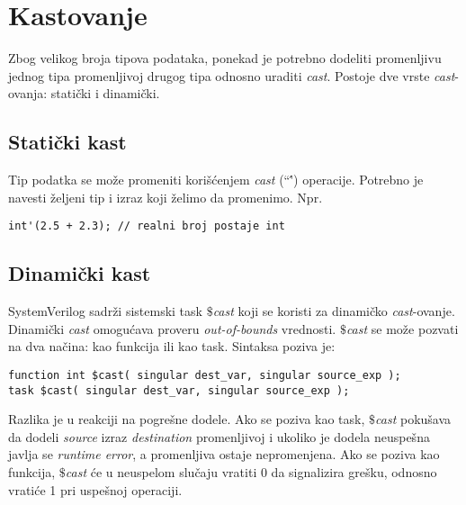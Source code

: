 \section{Kastovanje}

Zbog velikog broja tipova podataka, ponekad je potrebno dodeliti promenljivu
jednog tipa promenljivoj drugog tipa odnosno uraditi \emph{cast}. Postoje dve
vrste \emph{cast}-ovanja: statički i dinamički.


\subsection{Statički kast}

Tip podatka se može promeniti korišćenjem \emph{cast} (``\textquotesingle\'') operacije.
Potrebno je navesti željeni tip i izraz koji želimo da promenimo. Npr.

\begin{lstlisting}
int'(2.5 + 2.3); // realni broj postaje int
\end{lstlisting}


\subsection{Dinamički kast}

SystemVerilog sadrži sistemski task \emph{\(\$\)cast} koji se koristi za
dinamičko \emph{cast}-ovanje.
Dinamički \emph{cast} omogućava proveru \emph{out-of-bounds} vrednosti.
\emph{\(\$\)cast} se može pozvati na dva načina: kao funkcija ili kao task.
Sintaksa poziva je:

\begin{lstlisting}
function int $cast( singular dest_var, singular source_exp );
task $cast( singular dest_var, singular source_exp );
\end{lstlisting}

Razlika je u reakciji na pogrešne dodele.
Ako se poziva kao task, \emph{\(\$\)cast} pokušava da dodeli \emph{source} izraz
\emph{destination} promenljivoj i ukoliko je dodela neuspešna javlja se
\emph{runtime error}, a promenljiva ostaje nepromenjena.
Ako se poziva kao funkcija, \emph{\(\$\)cast} će u neuspelom slučaju vratiti 0
da signalizira grešku, odnosno vratiće 1 pri uspešnoj operaciji.\\

